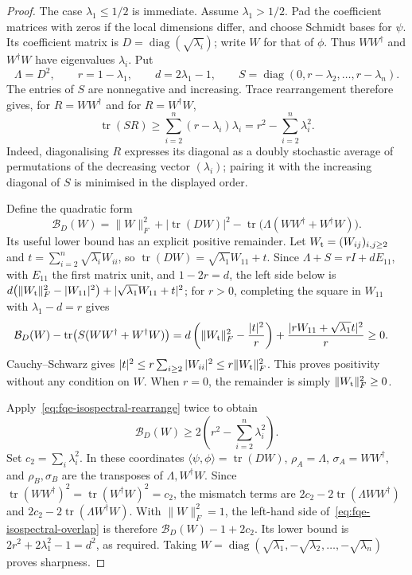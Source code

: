 \begin{proof}
The case $\lambda_1\le1/2$ is immediate. Assume $\lambda_1>1/2$.
Pad the coefficient matrices with zeros if the local dimensions differ,
and choose Schmidt bases for $\psi$. Its coefficient matrix is
$D=\operatorname{diag}(\sqrt{\lambda_i})$; write $W$ for that of $\phi$.
Thus $WW^\dagger$ and $W^\dagger W$ have eigenvalues $\lambda_i$.
Put
\[
 \Lambda=D^2,\qquad r=1-\lambda_1,\qquad d=2\lambda_1-1,
 \qquad S=\operatorname{diag}(0,r-\lambda_2,\ldots,r-\lambda_n).
\]
The entries of $S$ are nonnegative and increasing. Trace rearrangement
therefore gives, for $R=WW^\dagger$ and for $R=W^\dagger W$,
\begin{equation}\label{eq:fqe-isospectral-rearrange}
 \operatorname{tr}(SR)\ge
 \sum_{i=2}^n(r-\lambda_i)\lambda_i
 =r^2-\sum_{i=2}^n\lambda_i^2.
\end{equation}
Indeed, diagonalising $R$ expresses its diagonal as a doubly stochastic
average of permutations of the decreasing vector $(\lambda_i)$; pairing
it with the increasing diagonal of $S$ is minimised in the displayed order.

Define the quadratic form
\[
 \mathcal B_D(W)=\|W\|_F^2+|\operatorname{tr}(DW)|^2
       -\operatorname{tr}\bigl(\Lambda(WW^\dagger+W^\dagger W)\bigr).
\]
Its useful lower bound has an explicit positive remainder. Let
$W_{\rm t}=(W_{ij})_{i,j\ge2}$ and
$t=\sum_{i=2}^n\sqrt{\lambda_i}W_{ii}$, so $\operatorname{tr}(DW)=\sqrt{\lambda_1}W_{11}+t$. Since
$\Lambda+S=rI+dE_{11}$, with $E_{11}$ the first matrix unit, and $1-2r=d$, the left side below is
$d\bigl(\|W_{\rm t}\|_F^2-|W_{11}|^2\bigr)+|\sqrt{\lambda_1}W_{11}+t|^2$; for $r>0$, completing the square in
$W_{11}$ with $\lambda_1-d=r$ gives
\begin{equation}\label{eq:fqe-isospectral-calibration}
 \begin{split}
 \mathcal B_D(W)-\operatorname{tr}\bigl(S(WW^\dagger+W^\dagger W)\bigr)
 ={}&d\left(\|W_{\rm t}\|_F^2-\frac{|t|^2}{r}\right)
       +\frac{|rW_{11}+\sqrt{\lambda_1}t|^2}{r}\ge0.
 \end{split}
\end{equation}
Cauchy--Schwarz gives
$|t|^2\le r\sum_{i\ge2}|W_{ii}|^2\le r\|W_{\rm t}\|_F^2$.
This proves positivity without any condition on $W$.
When $r=0$, the remainder is simply $\|W_{\rm t}\|_F^2\ge0$.

Apply~\eqref{eq:fqe-isospectral-rearrange} twice to obtain
\[
 \mathcal B_D(W)\ge
 2\left(r^2-\sum_{i=2}^n\lambda_i^2\right).
\]
Set $c_2=\sum_i\lambda_i^2$. In these coordinates
$\langle\psi,\phi\rangle=\operatorname{tr}(DW)$, $\rho_A=\Lambda$, $\sigma_A=WW^\dagger$,
and $\rho_B,\sigma_B$ are the transposes of $\Lambda,W^\dagger W$. Since
$\operatorname{tr}(WW^\dagger)^2=\operatorname{tr}(W^\dagger W)^2=c_2$, the mismatch terms
are $2c_2-2\operatorname{tr}(\Lambda WW^\dagger)$ and
$2c_2-2\operatorname{tr}(\Lambda W^\dagger W)$. With $\|W\|_F^2=1$, the left-hand
side of~\eqref{eq:fqe-isospectral-overlap} is therefore
$\mathcal B_D(W)-1+2c_2$. Its lower bound is
$2r^2+2\lambda_1^2-1=d^2$, as required. Taking
$W=\operatorname{diag}(\sqrt{\lambda_1},-\sqrt{\lambda_2},\ldots,
-\sqrt{\lambda_n})$ proves sharpness.
\end{proof}

